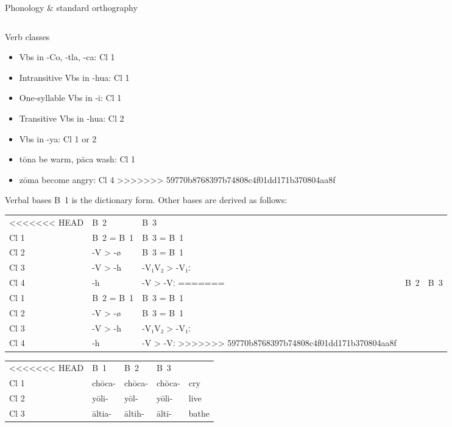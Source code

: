 \documentclass[12pt]{beamer}
\newcommand{\nah}[1]{\textcolor{nahgrn}{#1}}
\newcommand{\trs}[1]{\textcolor{nahblu}{#1}}
\begin{document}
\begin{frame}
\begin{columns}[t]
\begin{column}{.22\linewidth}
\begin{block}{Phonology \& standard orthography}
\begin{threeparttable}
\begin{tablenotes}
\begin{frame}
\begin{frame}
\begin{columns}[t]
\begin{column}{.18\linewidth}
\begin{block}{Verb classes}
\begin{itemize}
=======
          \item Vbs in \nah{-Co}, \nah{-tla}, \nah{-ca}: Cl 1
          \item Intransitive Vbs in \nah{-hua}: Cl 1
          \item One-syllable Vbs in \nah{-i}: Cl 1
          \item Transitive Vbs in \nah{-hua}: Cl 2
          \item Vbs in \nah{-ya}: Cl 1 or 2
          \item \nah{tōna} \trs{be warm}, \nah{pāca} \trs{wash}: Cl 1
          \item \nah{zōma} \trs{become angry}: Cl 4
>>>>>>> 59770b8768397b74808c4f01dd171b370804aa8f
        \end{itemize}
      \end{block}
      \begin{block}{Verbal bases}
        B~1 is the dictionary form. Other bases are derived as follows:
        \begin{tabular}{lll}
<<<<<<< HEAD
          & B~2               & B~3               \\
          Cl 1 & B~2 = B~1 & B~3 = B~1 \\
          Cl 2 & \nah{-V > -ø}      & B~3 = B~1 \\
          Cl 3 & \nah{-V > -h}     & \nah{-V₁V₂ > -V₁ː}   \\
          Cl 4 & \nah{-h}     & \nah{-V > -Vː}  
=======
               & B~2           & B~3                \\
          Cl 1 & B~2 = B~1     & B~3 = B~1          \\
          Cl 2 & \nah{-V > -ø} & B~3 = B~1          \\
          Cl 3 & \nah{-V > -h} & \nah{-V₁V₂ > -V₁ː} \\
          Cl 4 & \nah{-h}      & \nah{-V > -Vː}
>>>>>>> 59770b8768397b74808c4f01dd171b370804aa8f
        \end{tabular}
      \end{block}
      \begin{example}
        \begin{tabular}{lllll}
<<<<<<< HEAD
          & B~1          & B~2          & B~3          &                \\
          Cl 1 & \nah{chōca-} & \nah{chōca-} & \nah{chōca-} & \trs{cry}   \\
          Cl 2 & \nah{yōli-}  & \nah{yōl-}   & \nah{yōli-}  & \trs{live}  \\
          Cl 3 & \nah{āltia-} & \nah{āltih-} & \nah{āltī-}  & \trs{bathe} \\

\end{tabular}
\end{example}
\end{column}
\end{columns}
\end{frame}
\end{frame}
\end{tablenotes}
\end{threeparttable}
\end{block}
\end{column}
\end{columns}
\end{frame}
\end{document}
